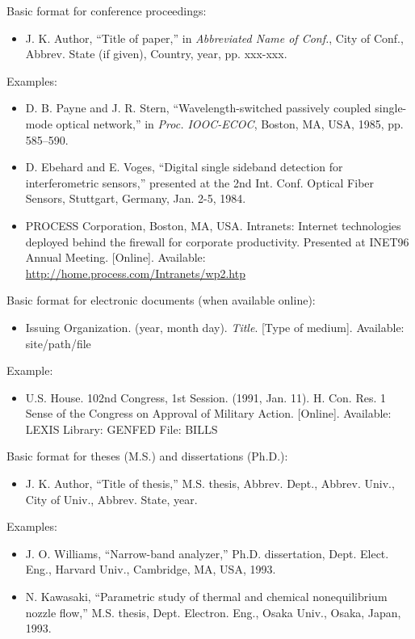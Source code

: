 \documentclass[11pt,a4paper]{article}
\begin{document}
Basic format for conference proceedings:
\begin{itemize}
    \item J. K. Author, “Title of paper,” in \textit{Abbreviated Name of Conf.}, City of Conf., Abbrev. State (if given), Country, year, pp. xxx-xxx.
\end{itemize}
Examples:
\begin{itemize}
    \item D. B. Payne and J. R. Stern, “Wavelength-switched passively coupled single-mode optical network,” in \textit{Proc. IOOC-ECOC}, Boston, MA, USA, 1985, pp. 585–590.
    \item D. Ebehard and E. Voges, “Digital single sideband detection for interferometric sensors,” presented at the 2nd Int. Conf. Optical Fiber Sensors, Stuttgart, Germany, Jan. 2-5, 1984.
    \item PROCESS Corporation, Boston, MA, USA. Intranets: Internet technologies deployed behind the firewall for corporate productivity. Presented at INET96 Annual Meeting. [Online]. Available: \url{http://home.process.com/Intranets/wp2.htp}
\end{itemize}

Basic format for electronic documents (when available online): 
\begin{itemize}
    \item Issuing Organization. (year, month day). \textit{Title}. [Type of medium]. Available: site/path/file
\end{itemize}
Example:
\begin{itemize}
    \item U.S. House. 102nd Congress, 1st Session. (1991, Jan. 11). H. Con. Res. 1 Sense of the Congress on Approval of Military Action. [Online]. Available: LEXIS Library: GENFED File: BILLS
\end{itemize}

Basic format for theses (M.S.) and dissertations (Ph.D.):
\begin{itemize}
    \item J. K. Author, “Title of thesis,” M.S. thesis, Abbrev. Dept., Abbrev. Univ., City of Univ., Abbrev. State, year.
\end{itemize}
Examples:
\begin{itemize}
    \item J. O. Williams, “Narrow-band analyzer,” Ph.D. dissertation, Dept. Elect. Eng., Harvard Univ., Cambridge, MA, USA, 1993.
    \item N. Kawasaki, “Parametric study of thermal and chemical nonequilibrium nozzle flow,” M.S. thesis, Dept. Electron. Eng., Osaka Univ., Osaka, Japan, 1993.
\end{itemize}
\end{document}
